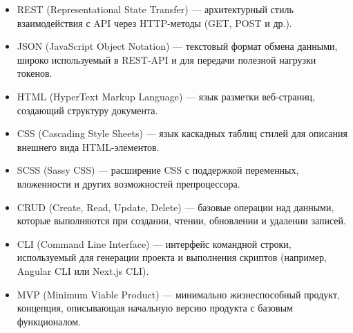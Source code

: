\begin{itemize}
  \item REST (Representational State Transfer) — архитектурный стиль взаимодействия с API через HTTP-методы (GET, POST и др.).
  \item JSON (JavaScript Object Notation) — текстовый формат обмена данными, широко используемый в REST-API и для передачи полезной нагрузки токенов.
  \item HTML (HyperText Markup Language) — язык разметки веб-страниц, создающий структуру документа.
  \item CSS (Cascading Style Sheets) — язык каскадных таблиц стилей для описания внешнего вида HTML-элементов.
  \item SCSS (Sassy CSS) — расширение CSS с поддержкой переменных, вложенности и других возможностей препроцессора.
  \item CRUD (Create, Read, Update, Delete) — базовые операции над данными, которые выполняются при создании, чтении, обновлении и удалении записей.
  \item CLI (Command Line Interface) — интерфейс командной строки, используемый для генерации проекта и выполнения скриптов (например, Angular CLI или Next.js CLI).
  \item MVP (Minimum Viable Product) — минимально жизнеспособный продукт, концепция, описывающая начальную версию продукта с базовым функционалом.
\end{itemize}